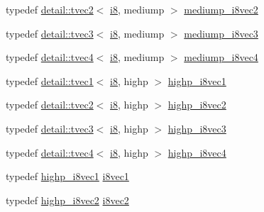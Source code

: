 \begin{DoxyCompactItemize}
\item 
typedef \hyperlink{structglm_1_1detail_1_1tvec2}{detail\+::tvec2}$<$ \hyperlink{group__gtc__type__precision_gaae064be68b7d36cd7910c16e8ad18bba}{i8}, mediump $>$ \hyperlink{group__gtc__type__precision_ga38eba1ab306fe5cc5eeafa35ce5b5b26}{mediump\+\_\+i8vec2}
\item 
typedef \hyperlink{structglm_1_1detail_1_1tvec3}{detail\+::tvec3}$<$ \hyperlink{group__gtc__type__precision_gaae064be68b7d36cd7910c16e8ad18bba}{i8}, mediump $>$ \hyperlink{group__gtc__type__precision_ga91b40a693c1db26a7cc544339b326df3}{mediump\+\_\+i8vec3}
\item 
typedef \hyperlink{structglm_1_1detail_1_1tvec4}{detail\+::tvec4}$<$ \hyperlink{group__gtc__type__precision_gaae064be68b7d36cd7910c16e8ad18bba}{i8}, mediump $>$ \hyperlink{group__gtc__type__precision_gad41bf4bfa504dc1191623ff77151d01f}{mediump\+\_\+i8vec4}
\item 
typedef \hyperlink{structglm_1_1detail_1_1tvec1}{detail\+::tvec1}$<$ \hyperlink{group__gtc__type__precision_gaae064be68b7d36cd7910c16e8ad18bba}{i8}, highp $>$ \hyperlink{group__gtc__type__precision_ga0334353753f93388bcc89f91c9aff476}{highp\+\_\+i8vec1}
\item 
typedef \hyperlink{structglm_1_1detail_1_1tvec2}{detail\+::tvec2}$<$ \hyperlink{group__gtc__type__precision_gaae064be68b7d36cd7910c16e8ad18bba}{i8}, highp $>$ \hyperlink{group__gtc__type__precision_ga2224945795a870e41d951f0847d54f02}{highp\+\_\+i8vec2}
\item 
typedef \hyperlink{structglm_1_1detail_1_1tvec3}{detail\+::tvec3}$<$ \hyperlink{group__gtc__type__precision_gaae064be68b7d36cd7910c16e8ad18bba}{i8}, highp $>$ \hyperlink{group__gtc__type__precision_gad716792169ce7de963df25b865714438}{highp\+\_\+i8vec3}
\item 
typedef \hyperlink{structglm_1_1detail_1_1tvec4}{detail\+::tvec4}$<$ \hyperlink{group__gtc__type__precision_gaae064be68b7d36cd7910c16e8ad18bba}{i8}, highp $>$ \hyperlink{group__gtc__type__precision_ga283b2f580a4bd7207d27418ef4a1068b}{highp\+\_\+i8vec4}
\item 
typedef \hyperlink{group__gtc__type__precision_ga0334353753f93388bcc89f91c9aff476}{highp\+\_\+i8vec1} \hyperlink{group__gtc__type__precision_gae67d2e1e7ebd1a79176cac554395b881}{i8vec1}
\item 
typedef \hyperlink{group__gtc__type__precision_ga2224945795a870e41d951f0847d54f02}{highp\+\_\+i8vec2} \hyperlink{group__gtc__type__precision_gafd7bbd3878c298014276975f999a8677}{i8vec2}
\item 

\end{DoxyCompactItemize}
